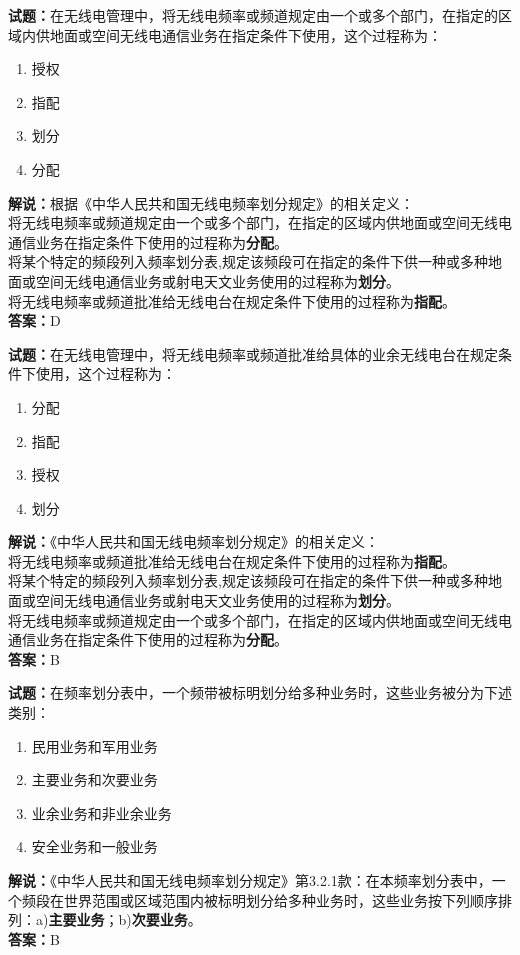 \documentclass{ctexbook}
\begin{document}
\noindent\textbf{试题：}在无线电管理中，将无线电频率或频道规定由一个或多个部门，在指定的区域内供地面或空间无线电通信业务在指定条件下使用，这个过程称为：
\begin{enumerate}[leftmargin=3em]
	\item 授权
	\item 指配
	\item 划分
	\item 分配
\end{enumerate}
\noindent\textbf{解说：}根据《中华人民共和国无线电频率划分规定》的相关定义：\\将无线电频率或频道规定由一个或多个部门，在指定的区域内供地面或空间无线电通信业务在指定条件下使用的过程称为\textbf{分配}。\\将某个特定的频段列入频率划分表,规定该频段可在指定的条件下供一种或多种地面或空间无线电通信业务或射电天文业务使用的过程称为\textbf{划分}。\\将无线电频率或频道批准给无线电台在规定条件下使用的过程称为\textbf{指配}。\\
\textbf{答案：}D



\bigskip


\noindent\textbf{试题：}在无线电管理中，将无线电频率或频道批准给具体的业余无线电台在规定条件下使用，这个过程称为：
\begin{enumerate}[leftmargin=3em]
	\item 分配
	\item 指配
	\item 授权
	\item 划分
\end{enumerate}
\noindent\textbf{解说：}《中华人民共和国无线电频率划分规定》的相关定义：\\将无线电频率或频道批准给无线电台在规定条件下使用的过程称为\textbf{指配}。\\将某个特定的频段列入频率划分表,规定该频段可在指定的条件下供一种或多种地面或空间无线电通信业务或射电天文业务使用的过程称为\textbf{划分}。\\将无线电频率或频道规定由一个或多个部门，在指定的区域内供地面或空间无线电通信业务在指定条件下使用的过程称为\textbf{分配}。\\
\textbf{答案：}B



\bigskip


\noindent\textbf{试题：}在频率划分表中，一个频带被标明划分给多种业务时，这些业务被分为下述类别：
\begin{enumerate}[leftmargin=3em]
	\item 民用业务和军用业务
	\item 主要业务和次要业务
	\item 业余业务和非业余业务
	\item 安全业务和一般业务
\end{enumerate}
\noindent\textbf{解说：}《中华人民共和国无线电频率划分规定》第3.2.1款：在本频率划分表中，一个频段在世界范围或区域范围内被标明划分给多种业务时，这些业务按下列顺序排列：a)\textbf{主要业务}；b)\textbf{次要业务}。\\\textbf{答案：}B
\end{document}
